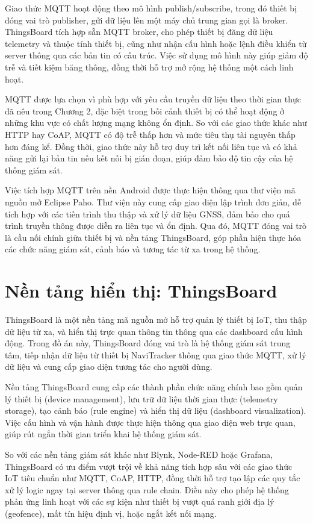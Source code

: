 \documentclass[../DoAn.tex]{subfiles}
\begin{document}
Giao thức MQTT hoạt động theo mô hình publish/subscribe, trong đó thiết bị đóng vai trò publisher, gửi dữ liệu lên một máy chủ trung gian gọi là broker. ThingsBoard tích hợp sẵn MQTT broker, cho phép thiết bị đăng dữ liệu telemetry và thuộc tính thiết bị, cũng như nhận cấu hình hoặc lệnh điều khiển từ server thông qua các bản tin có cấu trúc. Việc sử dụng mô hình này giúp giảm độ trễ và tiết kiệm băng thông, đồng thời hỗ trợ mở rộng hệ thống một cách linh hoạt.

MQTT được lựa chọn vì phù hợp với yêu cầu truyền dữ liệu theo thời gian thực đã nêu trong Chương 2, đặc biệt trong bối cảnh thiết bị có thể hoạt động ở những khu vực có chất lượng mạng không ổn định. So với các giao thức khác như HTTP hay CoAP, MQTT có độ trễ thấp hơn và mức tiêu thụ tài nguyên thấp hơn đáng kể. Đồng thời, giao thức này hỗ trợ duy trì kết nối liên tục và có khả năng gửi lại bản tin nếu kết nối bị gián đoạn, giúp đảm bảo độ tin cậy của hệ thống giám sát.

Việc tích hợp MQTT trên nền Android được thực hiện thông qua thư viện mã nguồn mở Eclipse Paho. Thư viện này cung cấp giao diện lập trình đơn giản, dễ tích hợp với các tiến trình thu thập và xử lý dữ liệu GNSS, đảm bảo cho quá trình truyền thông được diễn ra liên tục và ổn định. Qua đó, MQTT đóng vai trò là cầu nối chính giữa thiết bị và nền tảng ThingsBoard, góp phần hiện thực hóa các chức năng giám sát, cảnh báo và tương tác từ xa trong hệ thống.
\section{Nền tảng hiển thị: ThingsBoard}
\label{section:3.4}
ThingsBoard là một nền tảng mã nguồn mở hỗ trợ quản lý thiết bị IoT, thu thập dữ liệu từ xa, và hiển thị trực quan thông tin thông qua các dashboard cấu hình động. Trong đồ án này, ThingsBoard đóng vai trò là hệ thống giám sát trung tâm, tiếp nhận dữ liệu từ thiết bị NaviTracker thông qua giao thức MQTT, xử lý dữ liệu và cung cấp giao diện tương tác cho người dùng.

Nền tảng ThingsBoard cung cấp các thành phần chức năng chính bao gồm quản lý thiết bị (device management), lưu trữ dữ liệu thời gian thực (telemetry storage), tạo cảnh báo (rule engine) và hiển thị dữ liệu (dashboard visualization). Việc cấu hình và vận hành được thực hiện thông qua giao diện web trực quan, giúp rút ngắn thời gian triển khai hệ thống giám sát.

So với các nền tảng giám sát khác như Blynk, Node-RED hoặc Grafana, ThingsBoard có ưu điểm vượt trội về khả năng tích hợp sâu với các giao thức IoT tiêu chuẩn như MQTT, CoAP, HTTP, đồng thời hỗ trợ tạo lập các quy tắc xử lý logic ngay tại server thông qua rule chain. Điều này cho phép hệ thống phản ứng linh hoạt với các sự kiện như thiết bị vượt quá ranh giới địa lý (geofence), mất tín hiệu định vị, hoặc ngắt kết nối mạng.
\end{document}
